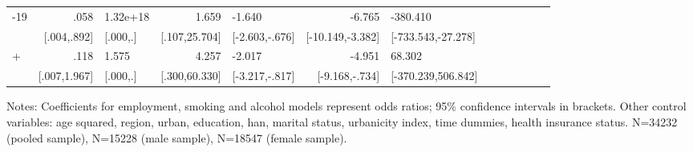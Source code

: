 \begin{table}[h]
\begin{adjustbox}{max width=\linewidth}
\begin{threeparttable}
{\begin{tabular}{l*{6}{D{.}{.}{-1}l}}
-19           &            .058&        1.32e+18&           1.659&          -1.640&          -6.765&        -380.410\\
                &     [.004,.892]&        [.000,.]&   [.107,25.704]&  [-2.603,-.676]&[-10.149,-3.382]&[-733.543,-27.278]\\
+             &            .118&           1.575&           4.257&          -2.017&          -4.951&          68.302\\
                &    [.007,1.967]&        [.000,.]&   [.300,60.330]&  [-3.217,-.817]&  [-9.168,-.734]&[-370.239,506.842]\\        
\bottomrule
\end{tabular}
\begin{tablenotes}
\item Notes: Coefficients for employment, smoking and alcohol models represent odds ratios;  95\% confidence intervals in brackets.
Other control variables: age squared, region, urban, education, han, marital status, urbanicity index, time dummies, health insurance status. N=34232 (pooled sample), N=15228 (male sample), N=18547 (female sample).
\end{tablenotes}
}
\end{threeparttable}
\end{adjustbox}
\end{table}

